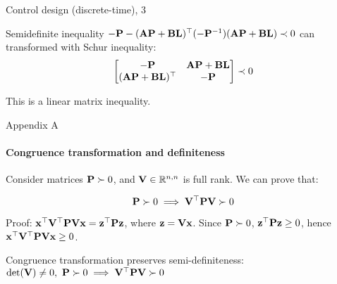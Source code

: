 \documentclass{beamer}
\begin{document}
\begin{frame}{Control design (discrete-time), 3}
	\begin{flushleft}
		
		Semidefinite inequality $-\mathbf{P} - (\mathbf{A}\mathbf{P} + \mathbf{B}\mathbf{L})^\top (-\mathbf{P}^{-1}) (\mathbf{A}\mathbf{P} + \mathbf{B}\mathbf{L})  \prec 0$ can transformed with Schur inequality:
		\begin{align}
			\begin{bmatrix}
				-\mathbf{P} & \mathbf{A}\mathbf{P} + \mathbf{B}\mathbf{L} \\
				(\mathbf{A}\mathbf{P} + \mathbf{B}\mathbf{L})^\top & -\mathbf{P}
			\end{bmatrix}  \prec 0
		\end{align}
		
		This is a linear matrix inequality.
		
	\end{flushleft}
\end{frame}







\begin{frame}{Appendix A}
	\framesubtitle{Congruence transformation and definiteness}
	\begin{flushleft}
		
		Consider matrices $\mathbf{P} \succ 0$, and $\mathbf{V} \in \mathbb{R}^{n, n}$ is full rank. We can prove that:
		
		\begin{equation}
			\mathbf{P} \succ 0 \implies \mathbf{V}^\top\mathbf{P}\mathbf{V} \succ 0
		\end{equation}
		
		Proof: $\mathbf{x}^\top\mathbf{V}^\top\mathbf{P}\mathbf{V}\mathbf{x} = \mathbf{z}^\top\mathbf{P}\mathbf{z}$, where $\mathbf{z} = \mathbf{V}\mathbf{x}$. Since $\mathbf{P} \succ 0$, $\mathbf{z}^\top\mathbf{P}\mathbf{z} \geq 0$, hence $\mathbf{x}^\top\mathbf{V}^\top\mathbf{P}\mathbf{V}\mathbf{x} \geq 0$. 
		
		\begin{definition}
			Congruence transformation preserves semi-definiteness: $\text{det}(\mathbf{V}) \neq 0, \ \mathbf{P} \succ 0 \implies \mathbf{V}^\top\mathbf{P}\mathbf{V} \succ 0$
		\end{definition}
		
		
	\end{flushleft}
\end{frame}


\myqrframe
\end{document}
